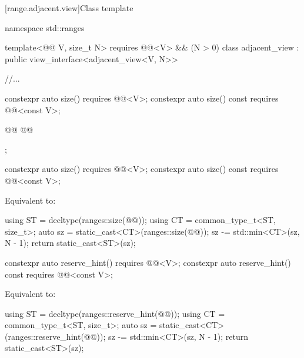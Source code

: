 \documentclass{wg21}
\begin{document}
 [range.adjacent.view]{Class template }

%
%
%
\begin{codeblock}
namespace std::ranges {
template<@@ V, size_t N>
requires @@<V> && (N > 0)
class adjacent_view : public view_interface<adjacent_view<V, N>> {
    //...

    constexpr auto size() requires @@<V>;
    constexpr auto size() const requires @@<const V>;

    @@
    @@

};
}
\end{codeblock}

\begin{itemdecl}
    constexpr auto size() requires @@<V>;
    constexpr auto size() const requires @@<const V>;
\end{itemdecl}

\begin{itemdescr}
    \pnum
    \effects
    Equivalent to:
    \begin{codeblock}
        using ST = decltype(ranges::size(@@));
        using CT = common_type_t<ST, size_t>;
        auto sz = static_cast<CT>(ranges::size(@@));
        sz -= std::min<CT>(sz, N - 1);
        return static_cast<ST>(sz);
    \end{codeblock}
\end{itemdescr}

\begin{addedblock}
\begin{itemdecl}
    constexpr auto reserve_hint() requires @@<V>;
    constexpr auto reserve_hint() const requires @@<const V>;
\end{itemdecl}

\begin{itemdescr}
\pnum
\effects
Equivalent to:
\begin{codeblock}
    using ST = decltype(ranges::reserve_hint(@@));
    using CT = common_type_t<ST, size_t>;
    auto sz = static_cast<CT>(ranges::reserve_hint(@@));
    sz -= std::min<CT>(sz, N - 1);
    return static_cast<ST>(sz);
\end{codeblock}
\end{itemdescr}
\end{addedblock}
\end{document}
